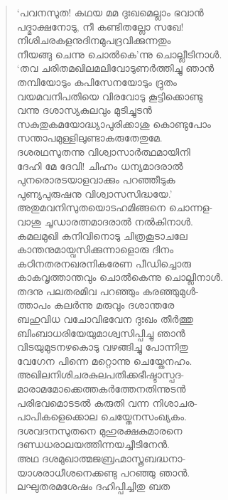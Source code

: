 \begin{verse}
‘പവനസുത! കഥയ മമ ദുഃഖമെല്ലാം ഭവാന്‍\\
പദ്മാക്ഷനോടു, നീ കണ്ടിതല്ലോ സഖേ!\\
നിശിചരകളനുദിനമുപദ്രവിക്കുന്നതും\\
നീയങ്ങു ചെന്നു ചൊല്‍കെ’ന്നു ചൊല്ലീടിനാള്‍.\\
‘തവ ചരിതമഖിലമലിവോടുണര്‍ത്തിച്ചു ഞാന്‍\\
തമ്പിയോടും കപിസേനയോടും ദ്രുതം\\
വയമവനിപതിയെ വിരവോടു കൂട്ടിക്കൊണ്ടു\\
വന്നു ദശാസ്യകുലവും മുടിച്ചുടന്‍\\
സകുതുകമയോദ്ധ്യാപുരിക്കാശു കൊണ്ടുപോം\\
സന്താപമുള്ളിലുണ്ടാകരുതേതുമേ.\\
ദശരഥസുതന്നു വിശ്വാസാര്‍ത്ഥമായിനി\\
ദേഹി മേ ദേവി! ചിഹ്നം ധന്യമാദരാല്‍\\
പുനരൊരടയാളവാക്കും പറഞ്ഞീടുക\\
പുണ്യപുരുഷനു വിശ്വാസസിദ്ധയേ.’\\
അതുമവനിസുതയൊടഹമിങ്ങനെ ചൊന്നള-\\
വാശു ചൂഡാരത്നമാദരാല്‍ നല്‍കിനാള്‍.\\
കമലമുഖി കനിവിനൊടു ചിത്രകൂടാചലേ\\
കാന്തനുമായ്വസിക്കുന്നാളൊരു ദിനം\\
കഠിനതരനഖരനികരേണ പീഡിച്ചൊരു\\
കാകവൃത്താന്തവും ചൊല്‍കെന്നു ചൊല്ലിനാള്‍.\\
തദനു പലതരമിവ പറഞ്ഞും കരഞ്ഞുമുള്‍-\\
ത്താപം കലര്‍ന്നു മരുവും ദശാന്തരേ\\
ബഹുവിധ വചോവിഭവേന ദുഃഖം തീര്‍ത്തു\\
ബിംബാധരിയേയുമാശ്വസിപ്പിച്ചു ഞാന്‍\\
വിടയുമുടനഴകൊടു വഴങ്ങിച്ചു പോന്നിതു\\
വേഗേന പിന്നെ മറ്റൊന്നു ചെയ്തേനഹം.\\
അഖിലനിശിചരകുലപതിക്കഭീഷ്ടാസ്പദ-\\
മാരാമമോക്കെത്തകര്‍ത്തേനതിന്നുടന്‍\\
പരിഭവമൊടടല്‍ കരുതി വന്ന നിശാചര-\\
പാപികളെക്കൊല ചെയ്തേനസംഖ്യകം.\\
ദശവദനസുതനെ മുഹുരക്ഷകുമാരനെ\\
ദണ്ഡധരാലയത്തിന്നയച്ചീടിനേന്‍.\\
അഥ ദശമുഖാത്മജബ്രഹ്മാസ്ത്രബദ്ധനാ-\\
യാശരാധീശനെക്കണ്ടു പറഞ്ഞു ഞാന്‍.\\
ലഘുതരമശേഷം ദഹിപ്പിച്ചിതു ബത\\

\end{verse}
